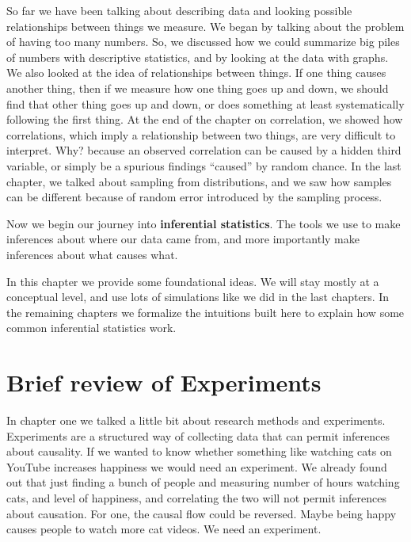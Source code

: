 \documentclass[
]{book}
\begin{document}
So far we have been talking about describing data and looking possible relationships between things we measure. We began by talking about the problem of having too many numbers. So, we discussed how we could summarize big piles of numbers with descriptive statistics, and by looking at the data with graphs. We also looked at the idea of relationships between things. If one thing causes another thing, then if we measure how one thing goes up and down, we should find that other thing goes up and down, or does something at least systematically following the first thing. At the end of the chapter on correlation, we showed how correlations, which imply a relationship between two things, are very difficult to interpret. Why? because an observed correlation can be caused by a hidden third variable, or simply be a spurious findings ``caused'' by random chance. In the last chapter, we talked about sampling from distributions, and we saw how samples can be different because of random error introduced by the sampling process.

Now we begin our journey into \textbf{inferential statistics}. The tools we use to make inferences about where our data came from, and more importantly make inferences about what causes what.

In this chapter we provide some foundational ideas. We will stay mostly at a conceptual level, and use lots of simulations like we did in the last chapters. In the remaining chapters we formalize the intuitions built here to explain how some common inferential statistics work.

\hypertarget{brief-review-of-experiments}{%
\section{Brief review of Experiments}\label{brief-review-of-experiments}}

In chapter one we talked a little bit about research methods and experiments. Experiments are a structured way of collecting data that can permit inferences about causality. If we wanted to know whether something like watching cats on YouTube increases happiness we would need an experiment. We already found out that just finding a bunch of people and measuring number of hours watching cats, and level of happiness, and correlating the two will not permit inferences about causation. For one, the causal flow could be reversed. Maybe being happy causes people to watch more cat videos. We need an experiment.
\end{document}
